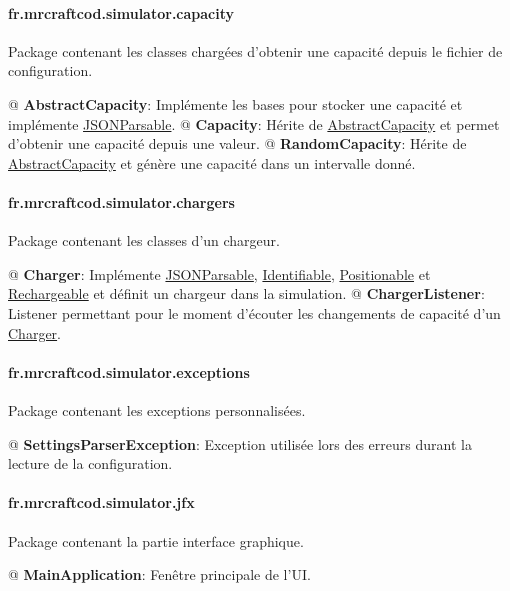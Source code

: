 \documentclass[final]{polytech/polytech}
\newcommand{\class}[1]{\textbf{#1}\label{class:#1}}
\newcommand{\klass}[1]{\hyperref[class:#1]{#1}}
\begin{document}
			\paragraph{fr.mrcraftcod.simulator.capacity}
				Package contenant les classes chargées d'obtenir une capacité depuis le fichier de configuration.
				
				\begin{easylist}
					@ \class{AbstractCapacity}: Implémente les bases pour stocker une capacité et implémente \klass{JSONParsable}.
					@ \class{Capacity}: Hérite de \klass{AbstractCapacity} et permet d'obtenir une capacité depuis une valeur.
					@ \class{RandomCapacity}: Hérite de \klass{AbstractCapacity} et génère une capacité dans un intervalle donné.
				\end{easylist}
				
			\paragraph{fr.mrcraftcod.simulator.chargers}
				Package contenant les classes d'un chargeur.
				
				\begin{easylist}
					@ \class{Charger}: Implémente \klass{JSONParsable}, \klass{Identifiable}, \klass{Positionable} et \klass{Rechargeable} et définit un chargeur dans la simulation.
					@ \class{ChargerListener}: Listener permettant pour le moment d'écouter les changements de capacité d'un \klass{Charger}.
				\end{easylist}
				
			\paragraph{fr.mrcraftcod.simulator.exceptions}
				Package contenant les exceptions personnalisées.
				
				\begin{easylist}
					@ \class{SettingsParserException}: Exception utilisée lors des erreurs durant la lecture de la configuration.
				\end{easylist}
				
			\paragraph{fr.mrcraftcod.simulator.jfx}
				Package contenant la partie interface graphique.
				
				\begin{easylist}
					@ \class{MainApplication}: Fenêtre principale de l'UI.
				\end{easylist}
				
\end{document}
